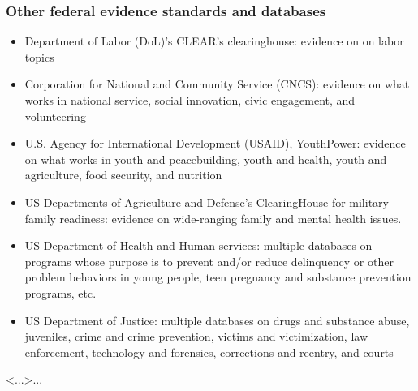 \documentclass[usenames,dvipsnames]{beamer}
\begin{document}

\begin{frame}[label= other_agencies]
\frametitle{Other federal evidence standards and databases}
\scriptsize
\begin{itemize}
	\item \textcolor{Cerulean}{Department of Labor} (DoL)'s CLEAR's clearinghouse: evidence on on labor topics 
	\item \textcolor{Cerulean}{Corporation for National and Community Service} (CNCS): evidence on what works in national service, social innovation, civic engagement, and volunteering
	\item \textcolor{Cerulean}{U.S. Agency for International Development} (USAID), YouthPower:  evidence on what works in youth and peacebuilding, youth and health, youth and agriculture, food security, and nutrition
	\item \textcolor{Cerulean}{US Departments of Agriculture and Defense}'s ClearingHouse for military family readiness: evidence on wide-ranging family and mental health issues. 
	\item \textcolor{Cerulean}{US Department of Health and Human services}: multiple databases on programs whose purpose is to prevent and/or reduce delinquency or other problem behaviors in young people, teen pregnancy and substance prevention programs, etc.
	\item \textcolor{Cerulean}{US Department of Justice}: multiple databases on drugs and substance abuse, juveniles, crime and crime prevention, victims and victimization, law enforcement, technology and forensics, corrections and reentry, and courts
\end{itemize}
\end{frame}


\begin{frame}[shrink=30]{\only<...>{...}}
\frametitle{}
\small

\end{frame}



%
\end{document}
